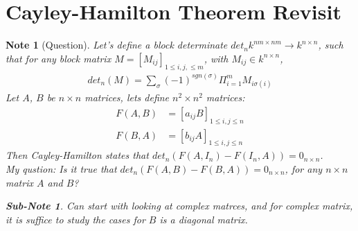 \documentclass[pdf]{article}
\newtheorem{note}[theorem]{Note}
\newtheorem{subnote}[corollary]{Sub-Note}
\begin{document}
\section{Cayley-Hamilton Theorem Revisit}

\begin{note}[Question]
Let's define a block determinate $det_n k^{nm\times nm} \to k^{n\times n}$, such that for any block matrix $M = [M_{ij}]_{1\leq i, j, \leq m}$, with $M_{ij}\in k^{n\times n}$,
\begin{align*}
det_n(M) = \sum\limits_\sigma (-1)^{sgn(\sigma)}\Pi_{i=1}^mM_{i\sigma(i)}
\end{align*}
Let $A$, $B$ be $n\times n$ matrices, lets define $n^2\times n^2$ matrices:
\begin{align*}
F(A,B) &= [a_{ij}B]_{1\leq i, j \leq n}\\
F(B,A) &= [b_{ij}A]_{1\leq i, j \leq n}
\end{align*}
Then Cayley-Hamilton states that $det_n(F(A,I_n) - F(I_n,A)) = 0_{n\times n}$.\\
My qustion: Is it true that $det_n(F(A,B) - F(B,A)) = 0_{n\times n}$, for any $n\times n$ matrix $A$ and $B$?
\begin{subnote}
Can start with looking at complex matrces, and for complex matrix, it is suffice to study the cases for $B$ is a diagonal matrix.
\end{subnote}
\end{note}
\end{document}
